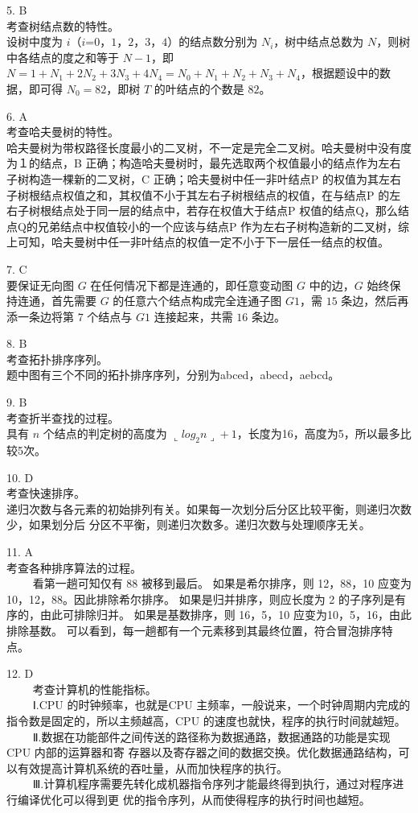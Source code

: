 5. B \\
考查树结点数的特性。 \\
设树中度为 $i$（$i$=$0$，$1$，$2$，$3$，$4$）的结点数分别为 $N_i$，树中结点总数为 $N$，则树中各结点的度之和等于 $N-1$，即 $N=1+N_1+2N_2+3N_3+4N_4=N_0+N_1+N_2+N_3+N_4$，根据题设中的数据，即可得 $N_0=82$，即树 $T$ 的叶结点的个数是 $82$。

6. A \\
考查哈夫曼树的特性。 \\
哈夫曼树为带权路径长度最小的二叉树，不一定是完全二叉树。哈夫曼树中没有度为１的结点，B 正确；构造哈夫曼树时，最先选取两个权值最小的结点作为左右子树构造一棵新的二叉树，C 正确；哈夫曼树中任一非叶结点P 的权值为其左右子树根结点权值之和，其权值不小于其左右子树根结点的权值，在与结点P 的左右子树根结点处于同一层的结点中，若存在权值大于结点P 权值的结点Q，那么结点Q的兄弟结点中权值较小的一个应该与结点P 作为左右子树构造新的二叉树，综上可知，哈夫曼树中任一非叶结点的权值一定不小于下一层任一结点的权值。

7. C \\
要保证无向图 $G$ 在任何情况下都是连通的，即任意变动图 $G$ 中的边，$G$ 始终保持连通，首先需要 $G$ 的任意六个结点构成完全连通子图 $G1$，需 $15$ 条边，然后再添一条边将第 $7$ 个结点与 $G1$ 连接起来，共需 $16$ 条边。

8. B \\
考查拓扑排序序列。 \\
题中图有三个不同的拓扑排序序列，分别为abced，abecd，aebcd。

9. B \\
考查折半查找的过程。 \\
具有 $n$ 个结点的判定树的高度为 $\llcorner log_2n\lrcorner+1$，长度为16，高度为5，所以最多比较5次。

10. D \\
考查快速排序。 \\
递归次数与各元素的初始排列有关。如果每一次划分后分区比较平衡，则递归次数少，如果划分后
分区不平衡，则递归次数多。递归次数与处理顺序无关。

11. A \\
考查各种排序算法的过程。\\
$\qquad$ 看第一趟可知仅有 88 被移到最后。
如果是希尔排序，则 12，88，10 应变为10，12，88。因此排除希尔排序。
如果是归并排序，则应长度为 2 的子序列是有序的，由此可排除归并。
如果是基数排序，则 16，5，10 应变为10，5，16，由此排除基数。
可以看到，每一趟都有一个元素移到其最终位置，符合冒泡排序特点。

12. D \\
$\qquad$ 考查计算机的性能指标。\\
$\qquad$ Ⅰ.CPU 的时钟频率，也就是CPU 主频率，一般说来，一个时钟周期内完成的指令数是固定的，所以主频越高，CPU 的速度也就快，程序的执行时间就越短。\\
$\qquad$ Ⅱ.数据在功能部件之间传送的路径称为数据通路，数据通路的功能是实现CPU 内部的运算器和寄
存器以及寄存器之间的数据交换。优化数据通路结构，可以有效提高计算机系统的吞吐量，从而加快程序的执行。\\
$\qquad$ Ⅲ.计算机程序需要先转化成机器指令序列才能最终得到执行，通过对程序进行编译优化可以得到更
优的指令序列，从而使得程序的执行时间也越短。

